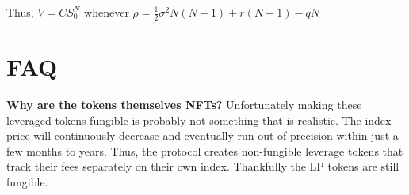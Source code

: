 \documentclass[12pt]{article}
\newcommand{\half}{\tfrac{1}{2}}
\begin{document}
    Thus, $V = CS_0^N$ whenever $\rho = \half\sigma^2 N (N-1) + r(N-1) - qN$

    \section{FAQ}

    \textbf{Why are the tokens themselves NFTs?} Unfortunately making these leveraged tokens fungible is probably not something that is realistic. The index price will continuously decrease and eventually run out of precision within just a few months to years. Thus, the protocol creates non-fungible leverage tokens that track their fees separately on their own index. Thankfully the LP tokens are still fungible.
\end{document}
